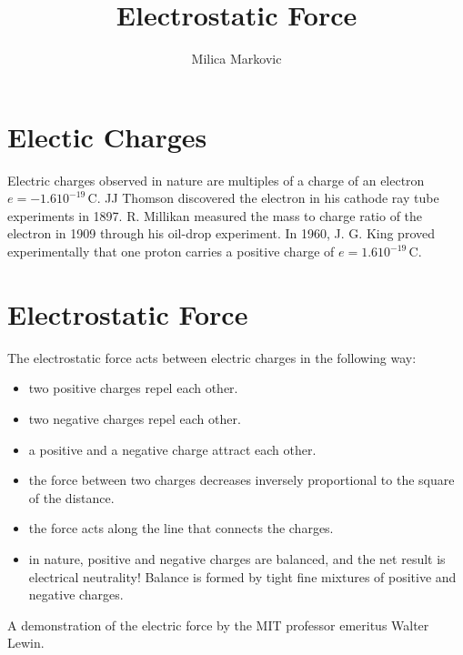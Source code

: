 \documentclass{ximera}
\title{Electrostatic Force}
\author{Milica Markovic}
\begin{document}
  
\begin{abstract}  

\end{abstract}  
\maketitle    



\section{Electic Charges}
 Electric charges observed in nature are multiples of a charge of an electron $e=-1.6 10^{-19}$\,C. JJ Thomson discovered the electron in his cathode ray tube experiments in  1897. R. Millikan measured the mass to charge ratio of the electron in 1909 through his oil-drop experiment.  In 1960, J. G. King proved experimentally that one proton carries a positive charge of $e=1.6 10^{-19}$\,C. 



\section{Electrostatic Force}

The electrostatic force acts between electric charges in the following way:

\begin{itemize}
\item two positive charges repel each other.
\item two negative charges repel each other.
\item a positive and a negative charge attract each other.
\item the force between two charges decreases inversely proportional to the square of the distance.
\item the force acts along the line that connects the charges.
\item in nature, positive and negative charges are balanced, and the net result is electrical neutrality! Balance is formed by tight fine mixtures of positive and negative charges.
\end{itemize}
 
 A demonstration of the electric force  by 
 the MIT professor emeritus Walter Lewin.
 
 \begin{center}
 \end{center}
 
\end{document}
